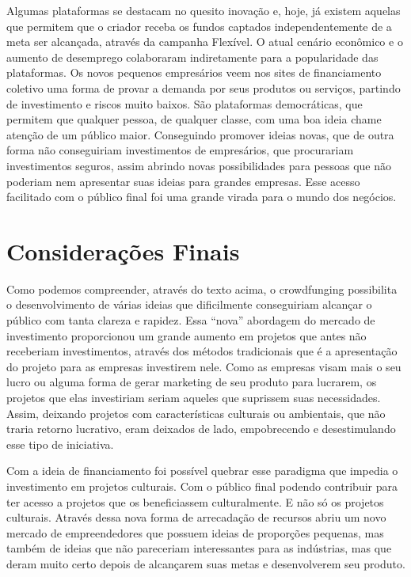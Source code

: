 \documentclass{classe_cn}                 %
\begin{document}
Algumas plataformas se destacam no quesito inovação e, hoje, já existem aquelas que permitem que o criador receba os fundos captados independentemente de a meta ser alcançada, através da campanha Flexível. O atual cenário econômico e o aumento de desemprego colaboraram indiretamente para a popularidade das plataformas. Os novos pequenos empresários veem nos sites de financiamento coletivo uma forma de provar a demanda por seus produtos ou serviços, partindo de investimento e riscos muito baixos. São plataformas democráticas, que permitem que qualquer pessoa, de qualquer classe, com uma boa ideia chame atenção de um público maior. Conseguindo promover ideias novas, que de outra forma não conseguiriam investimentos de empresários, que procurariam investimentos seguros, assim abrindo novas possibilidades para pessoas que não poderiam nem apresentar suas ideias para grandes empresas. Esse acesso facilitado com o público final foi uma grande virada para o mundo dos negócios.

\section{Considerações Finais}

Como podemos compreender, através do texto acima, o crowdfunging possibilita o desenvolvimento de várias ideias que dificilmente conseguiriam alcançar o público com tanta clareza e rapidez. Essa “nova” abordagem do mercado de investimento proporcionou um grande aumento em projetos que antes não receberiam investimentos, através dos métodos tradicionais que é a apresentação do projeto para as empresas investirem nele. Como as empresas visam mais o seu lucro ou alguma forma de gerar marketing de seu produto para lucrarem, os projetos que elas investiriam seriam aqueles que suprissem suas necessidades. Assim, deixando projetos com características culturais ou ambientais, que não traria retorno lucrativo, eram deixados de lado, empobrecendo e desestimulando esse tipo de iniciativa.

Com a ideia de financiamento foi possível quebrar esse paradigma que impedia o investimento em projetos culturais. Com o público final podendo contribuir para ter acesso a projetos que os beneficiassem culturalmente. E não só os projetos culturais. Através dessa nova forma de arrecadação de recursos abriu um novo mercado de empreendedores que possuem ideias de proporções pequenas, mas também de ideias que não pareceriam interessantes para as indústrias, mas que deram muito certo depois de alcançarem suas metas e desenvolverem seu produto.
\end{document}
